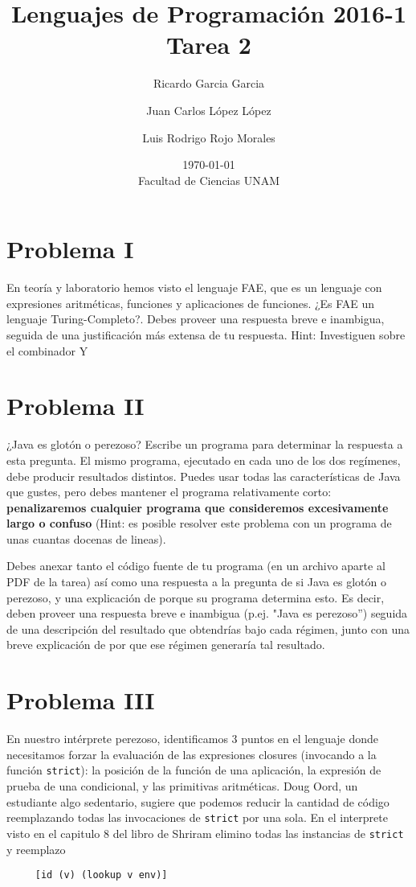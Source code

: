 \documentclass{article}
\title{Lenguajes de Programación 2016-1\\Tarea 2}
\author{Ricardo Garcia Garcia \and  Juan Carlos López López \and Luis Rodrigo Rojo Morales}
\date{\today\\ Facultad de Ciencias UNAM}
\begin{document}
\maketitle
\section*{Problema I}
En teoría y laboratorio hemos visto el lenguaje FAE, que es un lenguaje
con expresiones aritméticas, funciones y aplicaciones de funciones.
¿Es FAE un lenguaje Turing-Completo?. Debes proveer una respuesta breve e inambigua, seguida de una justificación más extensa de tu respuesta.
Hint: Investiguen sobre el combinador Y

\section*{Problema II}
¿Java es glotón o perezoso? Escribe un programa para determinar la respuesta a esta
pregunta. El mismo programa, ejecutado en cada uno de los dos regímenes, debe
producir resultados distintos. Puedes usar todas las características de Java
que gustes, pero debes mantener el programa relativamente corto:
\textbf{penalizaremos cualquier programa que consideremos excesivamente
  largo o confuso} (Hint: es posible resolver este problema con un programa
de unas cuantas docenas de lineas).

Debes anexar tanto el código fuente de tu programa (en un archivo aparte al PDF de
la tarea) así como una respuesta a la pregunta de si Java es glotón o perezoso,
y una explicación de porque su programa determina esto. Es decir, deben proveer una
respuesta breve e inambigua (p.ej. "Java es perezoso'') seguida de una descripción
del resultado que obtendrías bajo cada régimen, junto con una breve explicación
de por que ese régimen generaría tal resultado.

\section*{Problema III}
En nuestro intérprete perezoso, identificamos 3 puntos en el lenguaje donde
necesitamos forzar la evaluación de las expresiones closures (invocando a la
función \texttt{strict}): la posición de la función de una aplicación,
la expresión de prueba de una condicional, y las primitivas aritméticas.
Doug Oord, un estudiante algo sedentario, sugiere que podemos reducir
la cantidad de código reemplazando todas las invocaciones de \texttt{strict}
por una sola. En el interprete visto en el capitulo 8 del libro de Shriram
elimino todas las instancias de \texttt{strict} y reemplazo
\begin{verbatim}
     [id (v) (lookup v env)]
\end{verbatim}
\end{document}
